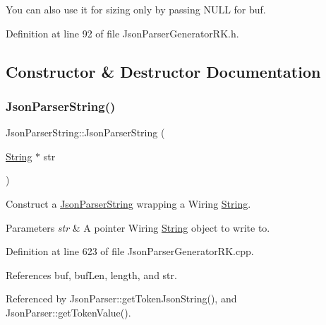 You can also use it for sizing only by passing N\+U\+LL for buf. 

Definition at line 92 of file Json\+Parser\+Generator\+R\+K.\+h.



\subsection{Constructor \& Destructor Documentation}
\mbox{\label{class_json_parser_string_a3942a87b6920b08e38ce01b4d4a41fc4}} 
\subsubsection{\texorpdfstring{Json\+Parser\+String()}{JsonParserString()}\hspace{0.1cm}{\footnotesize\ttfamily [1/2]}}
{\footnotesize\ttfamily Json\+Parser\+String\+::\+Json\+Parser\+String (\begin{DoxyParamCaption}\item[{\hyperlink{class_string}{String} $\ast$}]{str }\end{DoxyParamCaption})}



Construct a \hyperlink{class_json_parser_string}{Json\+Parser\+String} wrapping a Wiring \hyperlink{class_string}{String}. 


\begin{DoxyParams}{Parameters}
{\em str} & A pointer Wiring \hyperlink{class_string}{String} object to write to. \\
\hline
\end{DoxyParams}


Definition at line 623 of file Json\+Parser\+Generator\+R\+K.\+cpp.



References buf, buf\+Len, length, and str.



Referenced by Json\+Parser\+::get\+Token\+Json\+String(), and Json\+Parser\+::get\+Token\+Value().

\mbox{\label{class_json_parser_string_ae0f9e3309682685ed259ad1370eb448f}} 
